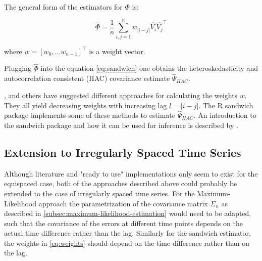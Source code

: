 The general form of the estimators for $\Phi$ is:

\begin{equation}\label{eq:weights}
\hat{\Phi} = \frac{1}{n} \sum_{i,j=1}^{n} w_{|i-j|}\hat{V_i}\hat{V_j}^{\top}
\end{equation}

where $w=[w_0, \dots w_{n-1}]^{\top}$ is a weight vector.

Plugging $\hat{\Phi}$ into the equation \ref{eq:sandwich} one obtains the
heteroskedasticity and autocorrelation consistent (HAC) covariance estimate $\hat{\Psi}_{HAC}$.

\citeauthor{newey_automatic_1994}, \citeauthor{andrews_heteroskedasticity_1991} and others have suggested different approaches
for calculating the weights $w$. They all yield decreasing weights with increasing lag $l=|i-j|$.
The R sandwich package implements some of these methods to estimate $\hat{\Psi}_{HAC}$.
An introduction to the sandwich package and how it can be used
for inference is described by \citeauthor{zeileis_econometric_2004}.


\subsection{Extension to Irregularly Spaced Time Series}

Although literature and "ready to use" implementations only seem to exist for the equispaced case,
both of the approaches described above could probably be extended to the case of irregularly spaced time series.
For the Maximum-Likelihood approach the parametrization of the covariance matrix $\Sigma_n$ as described in
\ref{subsec:maximum-likelihood-estimation} would need to be adapted,
such that the covariance of the errors at different time points depends on the actual time difference rather than the lag.
Similarly for the sandwich estimator, the weights in \ref{eq:weights} should depend on the time difference rather than on the lag.

